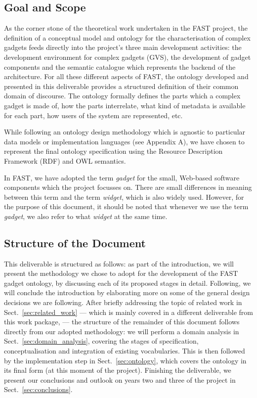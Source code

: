 \documentclass{fast_latex}
\begin{document}
\subsection{Goal and Scope} %
\label{sub:goal_and_scope}

As the corner stone of the theoretical work undertaken in the FAST project, the definition of a conceptual model and ontology for the characterisation of complex gadgets feeds directly into the project's three main development activities: the development environment for complex gadgets (GVS), the development of gadget components and the semantic catalogue which represents the backend of the architecture. For all these different aspects of FAST, the ontology developed and presented in this deliverable provides a structured definition of their common domain of discourse. The ontology formally defines the parts which a complex gadget is made of, how the parts interrelate, what kind of metadata is available for each part, how users of the system are represented, etc.

While following an ontology design methodology which is agnostic to particular data models or implementation languages (see Appendix A), we have chosen to represent the final ontology specification using the Resource Description Framework (RDF) and OWL semantics.

In FAST, we have adopted the term \emph{gadget} for the small, Web-based software components which the project focusses on. There are small differences in meaning between this term and the term \emph{widget}, which is also widely used. However, for the purpose of this document, it should be noted that whenever we use the term \emph{gadget}, we also refer to what \emph{widget} at the same time.


\subsection{Structure of the Document} %
\label{sub:structure_of_the_document}

This deliverable is structured as follows: as part of the introduction, we will present the methodology we chose to adopt for the development of the FAST gadget ontology, by discussing  each of its proposed stages in detail. Following, we will conclude the introduction by elaborating more on some of the general design decisions we are following. After briefly addressing the topic of related work in Sect.~\ref{sec:related_work} --- which is mainly covered in a different deliverable from this work package, \cite{urmetzer2010fast_state_of_the_art} --- the structure of the remainder of this document follows directly from our adopted methodology: we will perform a domain analysis in Sect.~\ref{sec:domain_analysis}, covering the stages of specification, conceptualisation and integration of existing vocabularies. This is then followed by the implementation step in Sect.~\ref{sec:ontology}, which covers the ontology in its final form (at this moment of the project). Finishing the deliverable, we present our conclusions and outlook on years two and three of the project in Sect.~\ref{sec:conclusions}.
\end{document}
